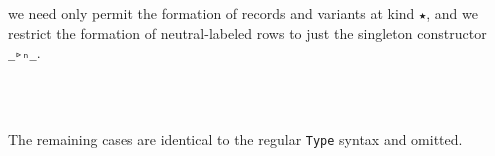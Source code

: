 \documentclass[authoryear, acmsmall, screen, review, nonacm]{acmart}
\begin{document}
\Ni we need only permit the formation of records and variants at kind \verb!★!, and we restrict the formation of neutral-labeled rows to just the singleton constructor \verb!_▹ₙ_!.

\begin{code}%
%
\>[2]%
\>[5]\AgdaSymbol{:}\AgdaSpace{}%
\AgdaSymbol{(}\AgdaSpace{}%
\AgdaSymbol{:}\AgdaSpace{}%
\AgdaSpace{}%
\AgdaSpace{}%
\AgdaOperator{\AgdaInductiveConstructor{R[}}\AgdaSpace{}%
\AgdaSpace{}%
\AgdaOperator{\AgdaInductiveConstructor{]}}\AgdaSymbol{)}\AgdaSpace{}%
\AgdaSpace{}%
\AgdaSpace{}%
\AgdaSpace{}%
\<%
\\
%
\>[2]%
\>[5]\AgdaSymbol{:}\AgdaSpace{}%
\AgdaSymbol{(}\AgdaSpace{}%
\AgdaSymbol{:}\AgdaSpace{}%
\AgdaSpace{}%
\AgdaSpace{}%
\AgdaOperator{\AgdaInductiveConstructor{R[}}\AgdaSpace{}%
\AgdaSpace{}%
\AgdaOperator{\AgdaInductiveConstructor{]}}\AgdaSymbol{)}\AgdaSpace{}%
\AgdaSpace{}%
\AgdaSpace{}%
\AgdaSpace{}%
\<%
\\
%
\>[2]\AgdaSpace{}%
\AgdaSymbol{:}\AgdaSpace{}%
\AgdaSymbol{(}\AgdaSpace{}%
\AgdaSymbol{:}\AgdaSpace{}%
\AgdaSpace{}%
\AgdaSpace{}%
\AgdaSymbol{)}\AgdaSpace{}%
\AgdaSymbol{(}\AgdaSpace{}%
\AgdaSymbol{:}\AgdaSpace{}%
\AgdaSpace{}%
\AgdaSpace{}%
\AgdaSymbol{)}\AgdaSpace{}%
\AgdaSpace{}%
\AgdaSpace{}%
\AgdaSpace{}%
\AgdaOperator{\AgdaInductiveConstructor{R[}}\AgdaSpace{}%
\AgdaSpace{}%
\AgdaOperator{\AgdaInductiveConstructor{]}}\<%
\end{code}

The remaining cases are identical to the regular \verb!Type! syntax and omitted.
\end{document}
